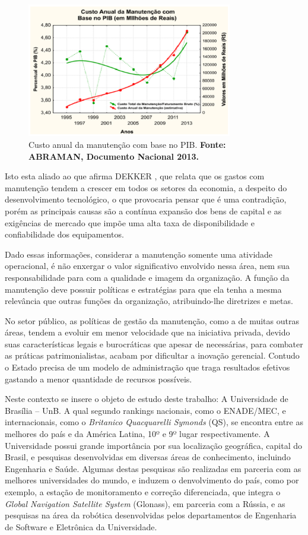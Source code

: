 \graphicspath{{figuras/}}
\begin{figure}[h]
\centering
\includegraphics[width=0.8\textwidth]{dados_pib_pesquisa_intro.eps}
\caption{Custo anual da manutenção com base no PIB. \textbf{Fonte: ABRAMAN, Documento Nacional 2013.}}
\label{custo_anual_2013}
\end{figure}


Isto esta aliado ao que afirma DEKKER \cite{dekker1998}, que relata que os gastos com manutenção tendem a crescer em todos os setores da economia, a despeito do desenvolvimento tecnológico, o que provocaria pensar que é uma contradição, porém as principais causas são a contínua expansão dos bens de capital e as exigências de mercado que impõe uma alta taxa de disponibilidade e confiabilidade dos equipamentos.

Dado essas informações, considerar a manutenção somente uma atividade operacional, é não enxergar o valor significativo envolvido nessa área, nem sua responsabilidade para com a qualidade e imagem da organização. A função da manutenção deve possuir políticas e estratégias para que ela tenha a mesma relevância que outras funções da organização, atribuindo-lhe diretrizes e metas.	

No setor público, as políticas de gestão da manutenção, como a de muitas outras áreas, tendem a evoluir em menor velocidade que na iniciativa privada, devido suas características legais e burocráticas que apesar de necessárias, para combater as práticas patrimonialistas, acabam por dificultar a inovação gerencial. Contudo o Estado precisa de um modelo de administração que traga resultados efetivos gastando a menor quantidade de recursos possíveis.


Neste contexto se insere o objeto de estudo deste trabalho: A Universidade de Brasília – UnB. A qual segundo rankings nacionais, como o ENADE/MEC, e internacionais, como o \emph{Britanico Quacquarelli Symonds} (QS), se encontra entre as melhores do país e da América Latina, 10º e 9º lugar respectivamente. A Universidade possui grande importância por sua localização geográfica, capital do Brasil, e pesquisas desenvolvidas em diversas áreas de conhecimento, incluindo Engenharia e Saúde. Algumas destas pesquisas são realizadas em parceria com as melhores universidades do mundo, e induzem o denvolvimento do país, como por exemplo, a estação de monitoramento e correção diferenciada, que integra o \emph{Global Navigation Satellite System} (Glonass), em parceria com a Rússia, e as pesquisas na área da robótica desenvolvidas pelos departamentos de Engenharia de Software e Eletrônica da Universidade.

